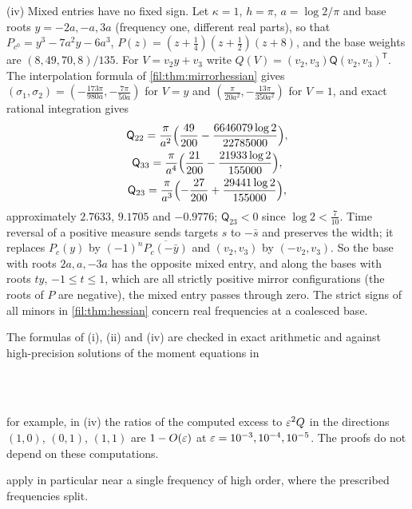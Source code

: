 \begin{example}
(iv) Mixed entries have no fixed sign. Let $\kappa=1$, $h=\pi$, $a=\log2/\pi$ and base roots $y=-2a,-a,3a$ (frequency
one, different real parts), so that $P_{c^0}=y^3-7a^2y-6a^3$, $P(z)=(z+\tfrac14)(z+\tfrac12)(z+8)$, and the base weights are
$(8,49,70,8)/135$. For $V=v_2y+v_3$ write $Q(V)=(v_2,v_3)\mathsf Q(v_2,v_3)^{\mathsf T}$. The interpolation formula of
\cref{fil:thm:mirrorhessian} gives $(\sigma_1,\sigma_2)=(-\tfrac{173\pi}{980a},-\tfrac{7\pi}{50a})$ for $V=y$ and
$(\tfrac\pi{20a^2},-\tfrac{13\pi}{350a^2})$ for $V=1$, and exact rational integration gives
\begin{gather*}
 \mathsf Q_{22}=\frac\pi{a^2}\Bigl(\frac{49}{200}-\frac{6646079\log2}{22785000}\Bigr),\\
 \mathsf Q_{33}=\frac\pi{a^4}\Bigl(\frac{21}{200}-\frac{21933\log2}{155000}\Bigr),\\
 \mathsf Q_{23}=\frac\pi{a^3}\Bigl(-\frac{27}{200}+\frac{29441\log2}{155000}\Bigr),
\end{gather*}
approximately $2.7633$, $9.1705$ and $-0.9776$; $\mathsf Q_{23}<0$ since $\log2<\tfrac7{10}$. Time reversal of a positive
measure sends targets $s$ to $-\bar s$ and preserves the width; it replaces $P_c(y)$ by $(-1)^n\overline{P_c(-\bar y)}$
and $(v_2,v_3)$ by $(-v_2,v_3)$. So the base with roots $2a,a,-3a$ has the opposite mixed entry, and along the bases
with roots $ty$, $-1\le t\le1$, which are all strictly positive mirror configurations (the roots of $P$ are
negative), the mixed entry passes through zero. The strict signs of all minors in \cref{fil:thm:hessian} concern
real frequencies at a coalesced base.
\end{example}

The formulas of (i), (ii) and (iv) are checked in exact arithmetic and against high-precision solutions of
the moment equations in
\begin{center}\small
{}\\
\\
\end{center}
for example, in (iv) the ratios of the computed excess to $\varepsilon^2Q$ in the directions $(1,0)$, $(0,1)$, $(1,1)$ are
$1-O(\varepsilon)$ at $\varepsilon=10^{-3},10^{-4},10^{-5}$. The proofs do not depend on these computations.

 apply in particular near a single frequency of high order, where
the prescribed frequencies split.

